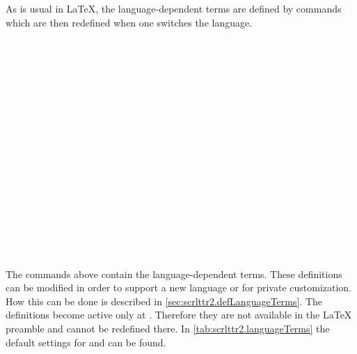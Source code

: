 As is usual in {\LaTeX}, the language-dependent terms are defined by
commands which are then redefined when one switches the language.

\begin{Declaration}
  \\
  \\
  \\
  \\
  \\
  \\
  \\
  \\
  \\
  \\
  \\
  \\
  \\
  \\
  \\
  \\
\end{Declaration}
 The commands above contain the
language-dependent terms. These definitions can be modified in order
to support a new language or for private customization.  How this can
be done is described in \autoref{sec:scrlttr2.defLanguageTerms}.  The
definitions become active only at .
Therefore they are not available in the {\LaTeX} preamble and cannot
be redefined there. In \autoref{tab:scrlttr2.languageTerms} the
default settings for  and  can be
found.
%

